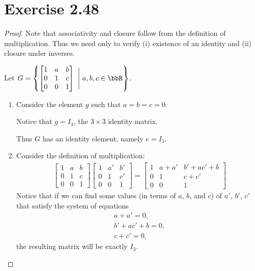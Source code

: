 \documentclass{article}
\begin{document}
\section*{Exercise 2.48}
\begin{proof} Note that associativity and closure follow from the definition of multiplication. Thus we need only to verify (i) existence of an identity and (ii) closure under inverses.

Let \(G=\left\{\begin{bmatrix}
    1 & a & b \\
    0 & 1 & c \\
    0 & 0 & 1
\end{bmatrix}\ \Bigg{\vert} \ a,b,c\in\bbR\right\}\).
\begin{enumerate}[label=(\roman*)]
    \item Consider the element \(g\) such that \(a = b = c = 0\).

    Notice that \(g = I_3\), the \(3\times 3\) identity matrix.

    Thus \(G\) has an identity element, namely \(e=I_3\).

    \item Consider the definition of multiplication:
    \begin{align*}
        \begin{bmatrix}
            1 & a & b \\
            0 & 1 & c \\
            0 & 0 & 1
        \end{bmatrix}
        \begin{bmatrix}
            1 & a' & b' \\
            0 & 1  & c' \\
            0 & 0  & 1
        \end{bmatrix}=
        \begin{bmatrix}
            1 & a + a' & b' + ac' + b \\
            0 & 1      & c + c' \\
            0 & 0      & 1
        \end{bmatrix}
    \end{align*}
    Notice that if we can find some values (in terms of \(a\), \(b\), and \(c\)) of \(a'\), \(b'\), \(c'\) that satisfy the system of equations \begin{align}
        a + a' = 0, \label{aa'}\\
        b' + ac' + b = 0, \\
        c + c' = 0, \label{cc'}
    \end{align}
    the resulting matrix will be exactly \(I_3\).


\end{enumerate}
\end{proof}
\end{document}
